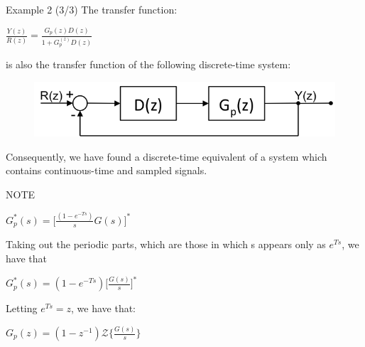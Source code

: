\begin{frame}
	\begin{exampleblock}{Example 2 (3/3)}
		\justify		
		The transfer function:
		\begin{center}
			$\frac{Y(z)}{R(z)} = \frac{G_p(z)D(z)}{1 +  G_p^(z)D(z)}$
		\end{center}
		is also the transfer function of the following discrete-time system:
		\begin{figure}
			\centering
			\includegraphics[width=0.8\linewidth]{block_analysis_3}
		\end{figure}
		Consequently, we have found a discrete-time equivalent of a system which contains continuous-time and sampled signals.
	\end{exampleblock}
\end{frame}

\begin{frame}
	\begin{alertblock}{NOTE}
	\begin{center}
		$G_p^{*}(s) = \big[ \frac{(1 - e^{-Ts})}{s} G(s) \big]^{*}$
	\end{center}
	Taking out the periodic parts, which are those in which s appears only as $e^{Ts}$, we have that
	\begin{center}
		$G_p^{*}(s) = (1 - e^{-Ts}) \big[ \frac{G(s)}{s} \big]^{*}$
	\end{center}
	Letting $e^{Ts} = z$, we have that:
	\begin{center}
		$G_p(z) = (1-z^{-1}) \mathcal{Z} \big\{ \frac{G(s)}{s} \big\}$
	\end{center}
	\end{alertblock}
\end{frame}